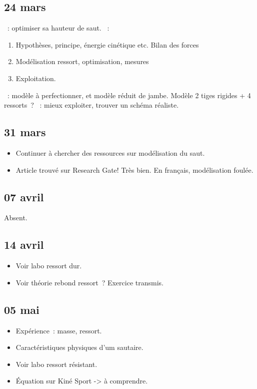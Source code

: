 \documentclass[a4paper, 11pt, final, garamond]{book}
\begin{document}
\subsection{24 mars}
\begin{itemize}
    ~: optimiser sa hauteur de saut.
    ~:
        \begin{enumerate}[label=\Roman*]
            \item Hypothèses, principe, énergie cinétique etc. Bilan des forces
            \item Modélisation ressort, optimisation, mesures
            \item Exploitation.
        \end{enumerate}
    ~: modèle à perfectionner, et modèle réduit de jambe. Modèle 2
        tiges rigides + 4 ressorts~?
    ~: mieux exploiter, trouver un schéma réaliste.
\end{itemize}

\subsection{31 mars}
\begin{itemize}
  \item Continuer à chercher des ressources sur modélisation du saut.
  \item Article trouvé sur Research Gate! Très bien. En français, modélisation
    foulée.
\end{itemize}

\subsection{07 avril}
\begin{center}
  Absent.
\end{center}

\subsection{14 avril}
\begin{itemize}
  \item Voir labo ressort dur.
  \item Voir théorie rebond ressort~? Exercice transmis.
\end{itemize}

\subsection{05 mai}
\begin{itemize}
  \item Expérience~: masse, ressort.
  \item Caractéristiques physiques d'um sautaire.
  \item Voir labo ressort résistant.
  \item Équation sur Kiné Sport -> à comprendre.
\end{itemize}
\end{document}
